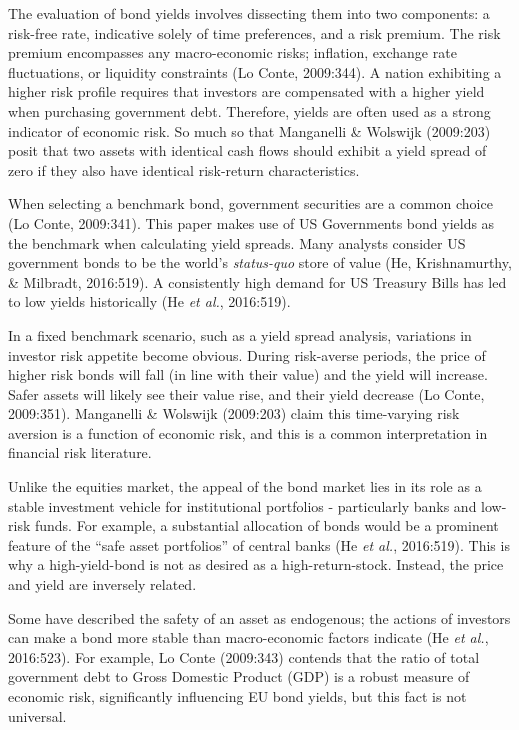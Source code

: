 \documentclass[11pt,preprint, authoryear]{elsarticle}
\numberwithin{equation}{section}
\numberwithin{figure}{section}
\numberwithin{table}{section}
\begin{document}
The evaluation of bond yields involves dissecting them into two
components: a risk-free rate, indicative solely of time preferences, and
a risk premium. The risk premium encompasses any macro-economic risks;
inflation, exchange rate fluctuations, or liquidity constraints (Lo
Conte, 2009:344). A nation exhibiting a higher risk profile requires
that investors are compensated with a higher yield when purchasing
government debt. Therefore, yields are often used as a strong indicator
of economic risk. So much so that Manganelli \& Wolswijk (2009:203)
posit that two assets with identical cash flows should exhibit a yield
spread of zero if they also have identical risk-return characteristics.

When selecting a benchmark bond, government securities are a common
choice (Lo Conte, 2009:341). This paper makes use of US Governments bond
yields as the benchmark when calculating yield spreads. Many analysts
consider US government bonds to be the world's \emph{status-quo} store
of value (He, Krishnamurthy, \& Milbradt, 2016:519). A consistently high
demand for US Treasury Bills has led to low yields historically (He
\emph{et al.}, 2016:519).

In a fixed benchmark scenario, such as a yield spread analysis,
variations in investor risk appetite become obvious. During risk-averse
periods, the price of higher risk bonds will fall (in line with their
value) and the yield will increase. Safer assets will likely see their
value rise, and their yield decrease (Lo Conte, 2009:351). Manganelli \&
Wolswijk (2009:203) claim this time-varying risk aversion is a function
of economic risk, and this is a common interpretation in financial risk
literature.

Unlike the equities market, the appeal of the bond market lies in its
role as a stable investment vehicle for institutional portfolios -
particularly banks and low-risk funds. For example, a substantial
allocation of bonds would be a prominent feature of the ``safe asset
portfolios'' of central banks (He \emph{et al.}, 2016:519). This is why
a high-yield-bond is not as desired as a high-return-stock. Instead, the
price and yield are inversely related.

Some have described the safety of an asset as endogenous; the actions of
investors can make a bond more stable than macro-economic factors
indicate (He \emph{et al.}, 2016:523). For example, Lo Conte (2009:343)
contends that the ratio of total government debt to Gross Domestic
Product (GDP) is a robust measure of economic risk, significantly
influencing EU bond yields, but this fact is not universal.
\end{document}
